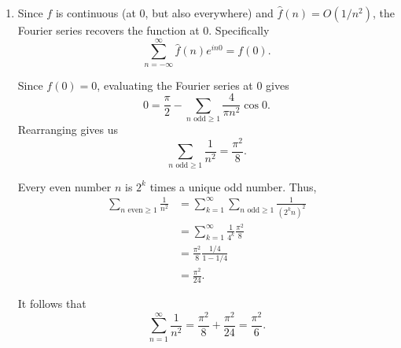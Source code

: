 \documentclass[12 pt, letterpaper]{hmcpset}
\begin{document}
\begin{solution}
\begin{enumerate}
			Notice that $\hat{f}(n) = \hat{f}(-n)$. Since $e^{i n \theta} + e^{-i n \theta} = 2 \cos{(n \theta)}$. Further since $\hat{f}(n) = 0$ for even $n$, we have
			\begin{align*}
				\sum_{n = -\infty}^{\infty} \hat{f}(n) e^{-i n \theta} & = \frac{\pi}{2} + \sum_{n = 1}^{\infty} 2 \hat{f}(n) \cos(n \theta) \\
										       & = \frac{\pi}{2} - \sum_{n \text{ odd} \ge 1} \frac{4}{\pi n^{2}} \cos{(n \theta)}.
			\end{align*}

		\item Since $f$ is continuous (at $0$, but also everywhere) and $\hat{f}(n) = O(1 / n^{2})$, the Fourier series recovers the function at $0$. Specifically
			\[
				\sum_{n = -\infty}^{\infty} \hat{f}(n) e^{i n 0} = f(0).
			\]
			
			Since $f(0) = 0$, evaluating the Fourier series at $0$ gives
			\[
				0 = \frac{\pi}{2} - \sum_{n \text{ odd} \ge 1} \frac{4}{\pi n^{2}} \cos{0}.
			\]
			Rearranging gives us
			\[
				\sum_{n \text{ odd} \ge 1} \frac{1}{n^{2}} = \frac{\pi^{2}}{8}.
			\]

			Every even number $n$ is $2^{k}$ times a unique odd number. Thus,
			\begin{align*}
				\sum_{n \text{ even} \ge 1} \frac{1}{n^{2}} & = \sum_{k = 1}^{\infty} \sum_{n \text{ odd} \ge 1} \frac{1}{(2^{k} n)^{2}} \\
									    & =  \sum_{k = 1}^{\infty} \frac{1}{4^k} \frac{\pi^{2}}{8} \\
									    & = \frac{\pi^{2}}{8} \frac{1 /4}{1 - 1/4} \\
									    & = \frac{\pi^{2}}{24}.
			\end{align*}

			It follows that
			\[
				\sum_{n = 1}^{\infty} \frac{1}{n^{2}} = \frac{\pi^{2}}{8} + \frac{\pi^{2}}{24} = \frac{\pi^{2}}{6}.
			\]
	\end{enumerate}
\end{solution}

\pagebreak
\end{document}
